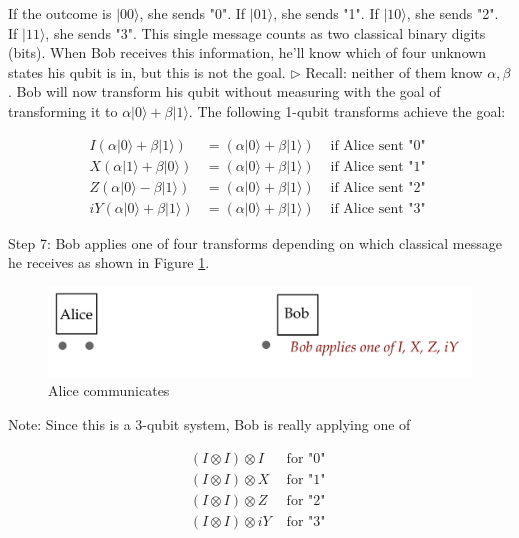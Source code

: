 \documentclass[main.tex]{subfiles}
\begin{document}
    If the outcome is $|00\rangle$, she sends "0". If $|01\rangle$, she sends "1". If $|10\rangle$, she sends "2". If $|11\rangle$, she sends "3". This single message counts as two classical binary digits (bits). When Bob receives this information, he'll know which of four unknown states his qubit is in, but this is not the goal. $\triangleright$ Recall: neither of them know $\alpha, \beta$. Bob will now transform his qubit without measuring with the goal of transforming it to $\alpha|0\rangle+\beta|1\rangle$. The following 1-qubit transforms achieve the goal:
    
    $$
    \begin{array}{rlr}
    I(\alpha|0\rangle+\beta|1\rangle) & =(\alpha|0\rangle+\beta|1\rangle) & \text { if Alice sent "0" } \\
    X(\alpha|1\rangle+\beta|0\rangle) & =(\alpha|0\rangle+\beta|1\rangle) & \text { if Alice sent "1" } \\
    Z(\alpha|0\rangle-\beta|1\rangle) & =(\alpha|0\rangle+\beta|1\rangle) & \text { if Alice sent "2" } \\
    i Y(\alpha|0\rangle+\beta|1\rangle) & =(\alpha|0\rangle+\beta|1\rangle) & \text { if Alice sent "3" }
    \end{array}
    $$
    
    Step 7: Bob applies one of four transforms depending on which classical message he receives as shown in Figure \ref{fig:34teleport7}.
    
    \begin{figure}
        \centering
        \includegraphics[width=5in]{notes/figs/n07/34teleport7.png}
        \caption{Alice communicates}
        \label{fig:34teleport7}
    \end{figure}
    
    Note: Since this is a 3-qubit system, Bob is really applying one of
    
    $$
    \begin{array}{cc}
    (I \otimes I) \otimes I & \text { for "0" } \\
    (I \otimes I) \otimes X & \text { for "1" } \\
    (I \otimes I) \otimes Z & \text { for "2" } \\
    (I \otimes I) \otimes i Y & \text { for "3" }
    \end{array}
    $$
    
\end{document}
